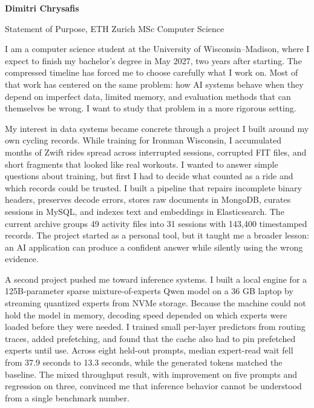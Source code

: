 \documentclass[11pt]{article}
\begin{document}
\begin{center}
{\large\bfseries Dimitri Chrysafis\par}
\vspace{2mm}
{\normalsize Statement of Purpose, ETH Zurich MSc Computer Science\par}
\end{center}

\vspace{4mm}

I am a computer science student at the University of Wisconsin--Madison, where I expect to finish my bachelor's degree in May 2027, two years after starting. The compressed timeline has forced me to choose carefully what I work on. Most of that work has centered on the same problem: how AI systems behave when they depend on imperfect data, limited memory, and evaluation methods that can themselves be wrong. I want to study that problem in a more rigorous setting.

My interest in data systems became concrete through a project I built around my own cycling records. While training for Ironman Wisconsin, I accumulated months of Zwift rides spread across interrupted sessions, corrupted FIT files, and short fragments that looked like real workouts. I wanted to answer simple questions about training, but first I had to decide what counted as a ride and which records could be trusted. I built a pipeline that repairs incomplete binary headers, preserves decode errors, stores raw documents in MongoDB, curates sessions in MySQL, and indexes text and embeddings in Elasticsearch. The current archive groups 49 activity files into 31 sessions with 143,400 timestamped records. The project started as a personal tool, but it taught me a broader lesson: an AI application can produce a confident answer while silently using the wrong evidence.

A second project pushed me toward inference systems. I built a local engine for a 125B-parameter sparse mixture-of-experts Qwen model on a 36 GB laptop by streaming quantized experts from NVMe storage. Because the machine could not hold the model in memory, decoding speed depended on which experts were loaded before they were needed. I trained small per-layer predictors from routing traces, added prefetching, and found that the cache also had to pin prefetched experts until use. Across eight held-out prompts, median expert-read wait fell from 37.9 seconds to 13.3 seconds, while the generated tokens matched the baseline. The mixed throughput result, with improvement on five prompts and regression on three, convinced me that inference behavior cannot be understood from a single benchmark number.
\end{document}

